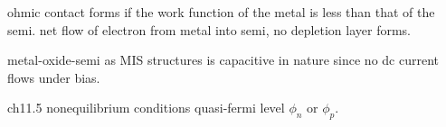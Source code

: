 ohmic contact forms if the work function of the metal is less than that of the semi. net flow of electron from metal into semi, no depletion layer forms.

metal-oxide-semi as MIS structures is capacitive in nature since no dc current flows under bias.

ch11.5 nonequilibrium conditions
quasi-fermi level $\phi_n$ or $\phi_p$.































